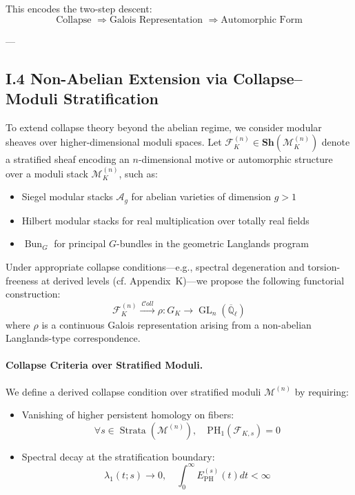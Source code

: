 \documentclass[11pt]{article}
\begin{document}
This encodes the two-step descent:
\[
\text{Collapse } \Rightarrow \text{Galois Representation } \Rightarrow \text{Automorphic Form}
\]

---

\subsection*{I.4 Non-Abelian Extension via Collapse–Moduli Stratification}
\label{subsec:collapse-langlands}

To extend collapse theory beyond the abelian regime, we consider modular sheaves over higher-dimensional moduli spaces.  
Let \( \mathcal{F}_K^{(n)} \in \mathbf{Sh}(\mathcal{M}_K^{(n)}) \) denote a stratified sheaf encoding an \( n \)-dimensional motive or automorphic structure over a moduli stack \( \mathcal{M}_K^{(n)} \), such as:

\begin{itemize}
  \item Siegel modular stacks \( \mathcal{A}_g \) for abelian varieties of dimension \( g > 1 \)
  \item Hilbert modular stacks for real multiplication over totally real fields
  \item \( \operatorname{Bun}_G \) for principal \( G \)-bundles in the geometric Langlands program
\end{itemize}

Under appropriate collapse conditions—e.g., spectral degeneration and torsion-freeness at derived levels (cf. Appendix~K)—we propose the following functorial construction:
\[
\mathcal{F}_K^{(n)} \xrightarrow{\ \mathcal{C}oll \ } \rho : G_K \to \operatorname{GL}_n(\overline{\mathbb{Q}}_\ell)
\]
where \( \rho \) is a continuous Galois representation arising from a non-abelian Langlands-type correspondence.

\medskip

\paragraph{Collapse Criteria over Stratified Moduli.}

We define a derived collapse condition over stratified moduli \( \mathcal{M}^{(n)} \) by requiring:
\begin{itemize}
  \item Vanishing of higher persistent homology on fibers:
  \[
  \forall s \in \operatorname{Strata}(\mathcal{M}^{(n)}), \quad \mathrm{PH}_1(\mathcal{F}_{K,s}) = 0
  \]
  \item Spectral decay at the stratification boundary:
  \[
  \lambda_1(t; s) \to 0, \quad \int_0^\infty E_{\mathrm{PH}}^{(s)}(t) dt < \infty
  \]
\end{itemize}
\end{document}
